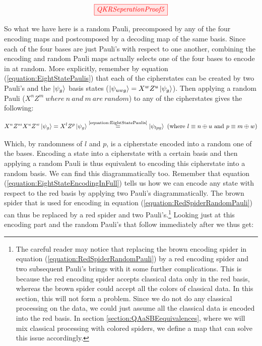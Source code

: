 \documentclass[]{article}
\newcommand{\equaltext}[1]{\ensuremath{\stackrel{\text{#1}}{=}}}
\begin{document}
\begin{equation}
	\label{equation:RedSpiderRandomPauli}
	\tikzfig{QKRSeperationProof5}
\end{equation}

So what we have here is a random Pauli, precomposed by any of the four encoding maps and postcomposed by a decoding map of the same basis. Since each of the four bases are just Pauli's with respect to one another, combining the encoding and random Pauli maps actually selects one of the four bases to encode in at random. More explicitly, remember by equation (\ref{equation:EightStatePaulis}) that each of the cipherstates can be created by two Pauli's and the $\ket{\psi_g}$ basis states ($\ket{\psi_{uwg}} = X^w Z^u\ket{\psi_{g}}$). Then applying a random Pauli ($X^n Z^m~where~n~and~m~are~random$) to any of the cipherstates gives the following:

\begin{equation}
\label{equation:EncodingInRandomCipherstate}
X^nZ^mX^uZ^w\ket{\psi_{g}} = X^lZ^p\ket{\psi_{g}} \equaltext{\ref{equation:EightStatePaulis}} \ket{\psi_{lpg}} ~(\text{where}~ l \equiv n \oplus u ~\text{and}~ p \equiv m \oplus w)
\end{equation}

Which, by randomness of $l$ and $p$, is a cipherstate encoded into a random one of the bases. Encoding a state into a cipherstate with a certain basis and then applying a random Pauli is thus equivalent to encoding this cipherstate into a random basis. We can find this diagrammatically too. Remember that equation (\ref{equation:EightStateEncodingInFull}) tells us how we can encode any state with respect to the red basis by applying two Pauli's diagrammatically. The brown spider that is used for encoding in equation (\ref{equation:RedSpiderRandomPauli}) can thus be replaced by a red spider and two Pauli's.\footnote{The careful reader may notice that replacing the brown encoding spider in equation (\ref{equation:RedSpiderRandomPauli}) by a red encoding spider and two subsequent Pauli's brings with it some further complications. This is because the red encoding spider accepts classical data only in the red basis, whereas the brown spider could accept all the colors of classical data. In this section, this will not form a problem. Since we do not do any classical processing on the data, we could just assume all the classical data is encoded into the red basis. In section \ref{section:QAaSBEequivalences}, where we will mix classical processing with colored spiders, we define a map that can solve this issue accordingly.} Looking just at this encoding part and the random Pauli's that follow immediately after we thus get:
\end{document}
